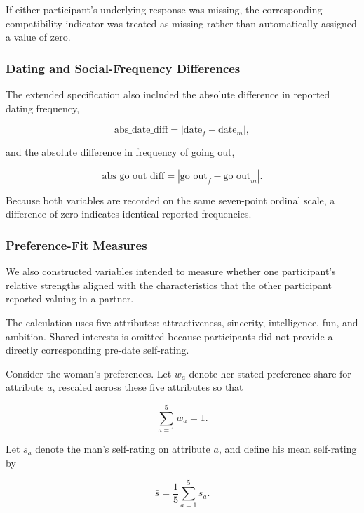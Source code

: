 \documentclass[11pt,letterpaper,reqno]{amsart}
\numberwithin{equation}{subsection}
\theoremstyle{definition}
\numberwithin{thm}{subsection}
\begin{document}
If either participant's underlying response was missing, the corresponding compatibility indicator was treated as missing rather than automatically assigned a value of zero.

\subsubsection{Dating and Social-Frequency Differences}

The extended specification also included the absolute difference in reported dating frequency,

\begin{equation}
\text{abs\_date\_diff}
=
\left|
\text{date}_{f}
-
\text{date}_{m}
\right|,
\end{equation}

and the absolute difference in frequency of going out,

\begin{equation}
\text{abs\_go\_out\_diff}
=
\left|
\text{go\_out}_{f}
-
\text{go\_out}_{m}
\right|.
\end{equation}

Because both variables are recorded on the same seven-point ordinal scale, a difference of zero indicates identical reported frequencies.

\subsubsection{Preference-Fit Measures}

We also constructed variables intended to measure whether one participant's relative strengths aligned with the characteristics that the other participant reported valuing in a partner.

The calculation uses five attributes: attractiveness, sincerity, intelligence, fun, and ambition. Shared interests is omitted because participants did not provide a directly corresponding pre-date self-rating.

Consider the woman's preferences. Let $w_a$ denote her stated preference share for attribute $a$, rescaled across these five attributes so that

\begin{equation}
\sum_{a=1}^{5} w_a = 1.
\end{equation}

Let $s_a$ denote the man's self-rating on attribute $a$, and define his mean self-rating by

\begin{equation}
\bar{s}
=
\frac{1}{5}
\sum_{a=1}^{5}
s_a.
\end{equation}
\end{document}
